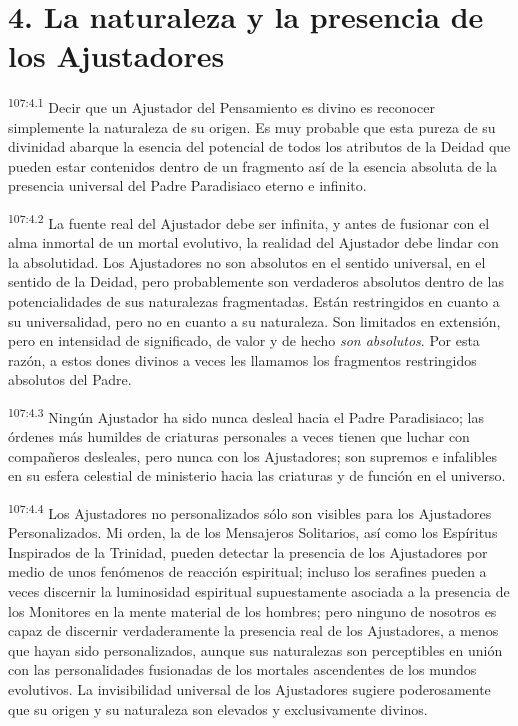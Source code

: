 \section*{4. La naturaleza y la presencia de los Ajustadores}
\par
\textsuperscript{107:4.1} Decir que un Ajustador del Pensamiento es divino es reconocer simplemente la naturaleza de su origen. Es muy probable que esta pureza de su divinidad abarque la esencia del potencial de todos los atributos de la Deidad que pueden estar contenidos dentro de un fragmento así de la esencia absoluta de la presencia universal del Padre Paradisiaco eterno e infinito.

\par
\textsuperscript{107:4.2} La fuente real del Ajustador debe ser infinita, y antes de fusionar con el alma inmortal de un mortal evolutivo, la realidad del Ajustador debe lindar con la absolutidad. Los Ajustadores no son absolutos en el sentido universal, en el sentido de la Deidad, pero probablemente son verdaderos absolutos dentro de las potencialidades de sus naturalezas fragmentadas. Están restringidos en cuanto a su universalidad, pero no en cuanto a su naturaleza. Son limitados en extensión, pero en intensidad de significado, de valor y de hecho \textit{son absolutos}. Por esta razón, a estos dones divinos a veces les llamamos los fragmentos restringidos absolutos del Padre.

\par
\textsuperscript{107:4.3} Ningún Ajustador ha sido nunca desleal hacia el Padre Paradisiaco; las órdenes más humildes de criaturas personales a veces tienen que luchar con compañeros desleales, pero nunca con los Ajustadores; son supremos e infalibles en su esfera celestial de ministerio hacia las criaturas y de función en el universo.

\par
\textsuperscript{107:4.4} Los Ajustadores no personalizados sólo son visibles para los Ajustadores Personalizados. Mi orden, la de los Mensajeros Solitarios, así como los Espíritus Inspirados de la Trinidad, pueden detectar la presencia de los Ajustadores por medio de unos fenómenos de reacción espiritual; incluso los serafines pueden a veces discernir la luminosidad espiritual supuestamente asociada a la presencia de los Monitores en la mente material de los hombres; pero ninguno de nosotros es capaz de discernir verdaderamente la presencia real de los Ajustadores, a menos que hayan sido personalizados, aunque sus naturalezas son perceptibles en unión con las personalidades fusionadas de los mortales ascendentes de los mundos evolutivos. La invisibilidad universal de los Ajustadores sugiere poderosamente que su origen y su naturaleza son elevados y exclusivamente divinos.

